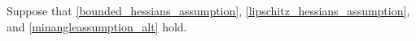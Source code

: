 Suppose that \cref{bounded_hessians_assumption}, \cref{lipschitz_hessians_assumption}, and \cref{minangleassumption_alt} hold.

